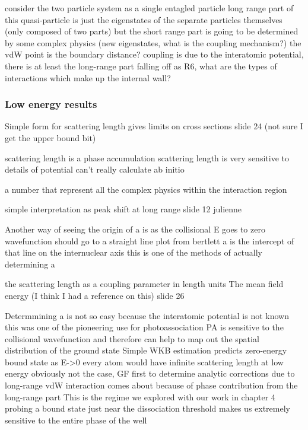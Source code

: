 consider the two particle system as a single entagled particle
	long range part of this quasi-particle is just the eigenstates of the separate particles themselves (only composed of two parts)
	but the short range part is going to be determined by some complex physics (new eigenstates, what is the coupling mechanism?)
		the vdW point is the boundary distance?
		coupling is due to the interatomic potential, there is at least the long-range part falling off as R6, what are the types of interactions which make up the internal wall?

\subsubsection{Low energy results} \label{sssec:sold_single_chan}

Simple form for scattering length
	gives limits on cross sections
	slide 24 (not sure I get the upper bound bit)

scattering length is a phase accumulation
	scattering length is very sensitive to details of potential
		can't really calculate ab initio
		
	a number that represent all the complex physics within the interaction region
	
	simple interpretation as peak shift at long range
		slide 12 julienne
	
Another way of seeing the origin of a is as the collisional E goes to zero
	wavefunction should go to a straight line
		plot from bertlett
	a is the intercept of that line on the internuclear axis
		this is one of the methods of actually determining a

the scattering length as a coupling parameter in length units
	The mean field energy (I think I had a reference on this)
	slide 26

Determmining a is not so easy because the interatomic potential is not known
	this was one of the pioneering use for photoassociation
	PA is sensitive to the collisional wavefunction and therefore can help to map out the spatial distribution of the ground state
Simple WKB estimation predicts zero-energy bound state as E->0
	every atom would have infinite scattering length at low energy
	obviously not the case, GF first to determine analytic corrections due to long-range vdW interaction
		comes about because of phase contribution from the long-range part
This is the regime we explored with our work in chapter 4
	probing a bound state just near the dissociation threshold makes us extremely sensitive to the entire phase of the well



